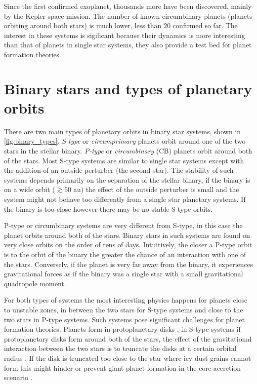 \documentclass[ twoside,openright,titlepage,numbers=noenddot,headinclude,%
                footinclude=true,cleardoublepage=empty,abstractoff, %
                BCOR=5mm,paper=a4,fontsize=11pt,%
                american,%
                ]{scrreprt}
\begin{document}
 Since the first confirmed exoplanet, thousands more  have been discovered, 
 mainly by the Kepler space mission. The number of known circumbinary
 planets  (planets orbiting around both stars)
 is much lower, less than 20 confirmed so far. The interest in these systems
 is sigificant because their dynamics is more interesting than that of planets
 in single star systems, they also provide a test bed for planet formation 
 theories.
 
\section{Binary stars and types of planetary orbits}
\label{sec:Binary_stars_and_types_of_planetary_orbits}
There are two main types of planetary orbits in binary star systems, shown in
\cref{fig:binary_types}. \emph{S-type} or \emph{circumprimary} planets orbit
around one of the two stars in the stellar binary. \emph{P-type} or \emph{
    circumbinary} (CB) planets orbit around both of the stars. 
Most S-type systems
are similar to single star systems except with the addition of an outside 
perturber (the second star). The stability of such systems depends primarily 
on the separation of the stellar binary, if the binary is on a wide orbit
($\gtrsim 50$ au) the effect of the outside perturber is small and the system
might not behave too differently from a single star planetary systems. 
If the binary is too close  however there may be no stable S-type orbits. 

P-type or circumbinary systems are very different from S-type, in this case 
the planet orbits around both of the stars. Binary stars in such systems
are found on very close orbits on the order of tens of days. Intuitively,
 the closer a P-type orbit is to the orbit of the binary the greater the 
 chance of an interaction with one of the stars. Conversely, if the planet
 is very far away from the binary, it experiences gravitational forces 
 as if the binary was a single star with a small gravitational quadropole 
 moment. 

 For both types of systems the most interesting physics happens for planets
 close to unstable zones, in between the two stars for S-type systems and 
 close to the two stars in P-type systems. Such systems pose significant 
 challenges for planet formation theories. Planets form in protoplanetary
 disks \citep{armitage2010}, in S-type systems if protoplanetary disks form 
 around both of the stars, the effect of the gravitational interaction
 between the two stars is to truncate the disks at a certain orbital radius
 \citep{pichardo2005}. If the disk is truncated too close to the star where
 icy dust grains cannot form this might hinder or prevent giant planet
 formation in the core-accretion scenario \cite{Lissauer1993}.
\end{document}
